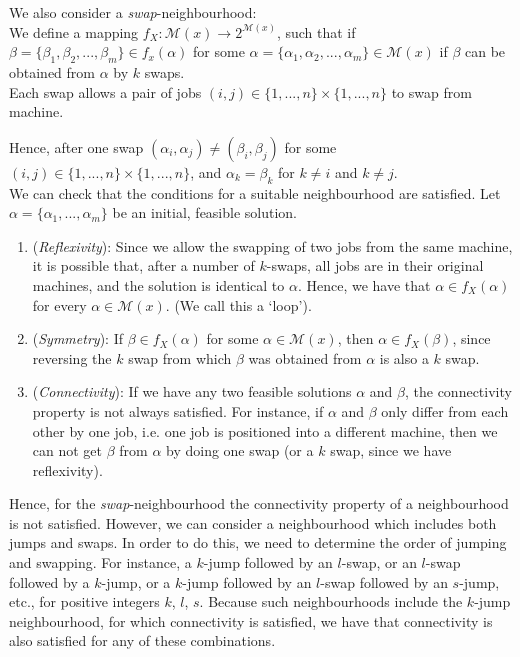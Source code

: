 \documentclass[12pt,a4paper,leqno]{article}
\begin{document}
We also consider a \textit{swap}-neighbourhood: \\

We define a mapping $f_X: \mathcal{M}(x) \rightarrow 2^{\mathcal{M}(x)}$, such that if $\beta = \{\beta_1,\beta_2,...,\beta_m \} \in f_x(\alpha)$ for some $\alpha = \{\alpha_1,\alpha_2,...,\alpha_m \} \in \mathcal{M}(x)$ if $\beta$ can be obtained from $\alpha$ by $k$ swaps. \\

Each swap allows a pair of jobs $(i,j) \in \{1,...,n\} \times \{1,...,n\}$ to swap from machine. 

Hence, after one swap $(\alpha_i, \alpha_j) \neq (\beta_i,\beta_j)$ for some $(i,j) \in \{1,...,n\} \times \{1,...,n\}$, and $\alpha_k = \beta_k$ for $k \neq i$ and $k \neq j$.  \\

We can check that the conditions for a suitable neighbourhood are satisfied. Let $\alpha = \{\alpha_1,...,\alpha_m\}$ be an initial, feasible solution.
\begin{enumerate}

\item (\textit{Reflexivity}): Since we allow the swapping of two jobs from the same machine, it is possible that, after a number of $k$-swaps, all jobs are in their original machines, and the solution is identical to $\alpha$. Hence, we have that $\alpha \in f_X(\alpha)$ for every $\alpha \in \mathcal{M}(x)$. (We call this a `loop').

\item (\textit{Symmetry}): If $\beta \in f_X(\alpha)$ for some $\alpha \in \mathcal{M}(x)$, then $\alpha \in f_X(\beta)$, since reversing the $k$ swap from which $\beta$ was obtained from $\alpha$ is also a $k$ swap. 

\item (\textit{Connectivity}): If we have any two feasible solutions $\alpha$ and $\beta$, the connectivity property is not always satisfied. For instance, if $\alpha$ and $\beta$ only differ from each other by one job, i.e. one job is positioned into a different machine, then we can not get $\beta$ from $\alpha$ by doing one swap (or a $k$ swap, since we have reflexivity). 

\end{enumerate}

Hence, for the \textit{swap}-neighbourhood the connectivity property of a neighbourhood is not satisfied. However, we can consider a neighbourhood which includes both jumps and swaps. In order to do this, we need to determine the order of jumping and swapping. For instance, a $k$-jump followed by an $l$-swap, or an $l$-swap followed by a $k$-jump, or a $k$-jump followed by an $l$-swap followed by an $s$-jump, etc., for positive integers $k$, $l$, $s$. Because such neighbourhoods include the $k$-jump neighbourhood, for which connectivity is satisfied, we have that connectivity is also satisfied for any of these combinations. 
\end{document}

